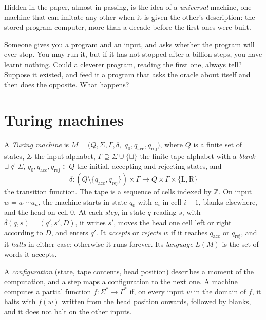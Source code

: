 Hidden in the paper, almost in passing, is the idea of a \emph{universal} machine, one machine that can imitate any other when it is given the other's description: the stored-program computer, more than a decade before the first ones were built.

\begin{think}
Someone gives you a program and an input, and asks whether the program will ever stop. You may run it, but if it has not stopped after a billion steps, you have learnt nothing. Could a cleverer program, reading the first one, always tell? Suppose it existed, and feed it a program that asks the oracle about itself and then does the opposite. What happens?
\end{think}

\section{Turing machines}\label{sec:tm}

\begin{definition}\label{def:tm}
A \emph{Turing machine} is $M=(Q,\Sigma,\Gamma,\delta,$ $q_0,q_{\mathrm{acc}},q_{\mathrm{rej}})$, where $Q$ is a finite set of states, $\Sigma$ the input alphabet, $\Gamma\supseteq\Sigma\cup\{\sqcup\}$ the finite tape alphabet with a \emph{blank} $\sqcup\notin\Sigma$, $q_0,q_{\mathrm{acc}},q_{\mathrm{rej}}\in Q$ the initial, accepting and rejecting states, and
\[
\delta:(Q\setminus\{q_{\mathrm{acc}},q_{\mathrm{rej}}\})\times\Gamma\to Q\times\Gamma\times\{\mathrm L,\mathrm R\}
\]
the transition function. The tape is a sequence of cells indexed by $\mathbb Z$. On input $w=a_1\cdots a_n$, the machine starts in state $q_0$ with $a_i$ in cell $i-1$, blanks elsewhere, and the head on cell $0$. At each \emph{step}, in state $q$ reading $s$, with $\delta(q,s)=(q',s',D)$, it writes $s'$, moves the head one cell left or right according to $D$, and enters $q'$. It \emph{accepts} or \emph{rejects} $w$ if it reaches $q_{\mathrm{acc}}$ or $q_{\mathrm{rej}}$, and it \emph{halts} in either case; otherwise it runs forever. Its \emph{language} $L(M)$ is the set of words it accepts.
\end{definition}

A \emph{configuration} (state, tape contents, head position) describes a moment of the computation, and a step maps a configuration to the next one. A machine computes a partial function $f:\Sigma^*\to\Gamma^*$ if, on every input $w$ in the domain of $f$, it halts with $f(w)$ written from the head position onwards, followed by blanks, and it does not halt on the other inputs.

